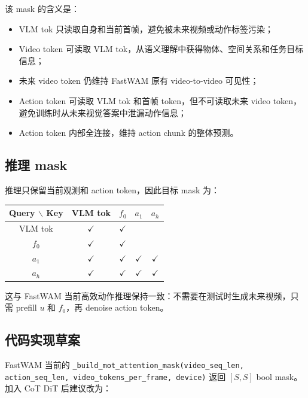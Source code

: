 \documentclass[UTF8,a4paper,11pt]{ctexart}
\newcommand{\yes}{\ensuremath{\checkmark}}
\begin{document}
该 mask 的含义是：
\begin{itemize}[leftmargin=1.6em]
  \item VLM tok 只读取自身和当前首帧，避免被未来视频或动作标签污染；
  \item Video token 可读取 VLM tok，从语义理解中获得物体、空间关系和任务目标信息；
  \item 未来 video token 仍维持 FastWAM 原有 video-to-video 可见性；
  \item Action token 可读取 VLM tok 和首帧 token，但不可读取未来 video token，避免训练时从未来视觉答案中泄漏动作信息；
  \item Action token 内部全连接，维持 action chunk 的整体预测。
\end{itemize}

\subsection{推理 mask}

推理只保留当前观测和 action token，因此目标 mask 为：

\begin{center}
\begin{tabular}{c|cccc}
\toprule
Query $\backslash$ Key & VLM tok & $f_0$ & $a_1$ & $a_h$ \\
\midrule
VLM tok & \yes & \yes & & \\
$f_0$   & \yes & \yes & & \\
$a_1$   & \yes & \yes & \yes & \yes \\
$a_h$   & \yes & \yes & \yes & \yes \\
\bottomrule
\end{tabular}
\end{center}

这与 FastWAM 当前高效动作推理保持一致：不需要在测试时生成未来视频，只需 prefill $u$ 和 $f_0$，再 denoise action token。

\subsection{代码实现草案}

FastWAM 当前的 \texttt{\_build\_mot\_attention\_mask(video\_seq\_len, action\_seq\_len, video\_tokens\_per\_frame, device)} 返回 $[S,S]$ bool mask。加入 CoT DiT 后建议改为：
\end{document}
